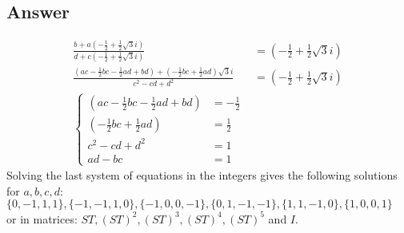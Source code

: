 \subsection*{Answer}
\noindent
\begin{align*}
    \frac{b + a (-\frac{1}{2}+\frac{1}{2}\sqrt{3}i)}{d + c (-\frac{1}{2}+\frac{1}{2}\sqrt{3}i)} &= (-\frac{1}{2}+\frac{1}{2}\sqrt{3}i) \\
    \frac{(a c - \frac{1}{2}b c - \frac{1}{2}a d + b d)+(- \frac{1}{2} bc + \frac{1}{2} ad)\sqrt{3}i}{c^2 - cd + d^2}&= (-\frac{1}{2}+\frac{1}{2}\sqrt{3}i) \\
    \left\{
    \begin{array}{ll}
        (a c - \frac{1}{2}b c - \frac{1}{2}a d + b d) &= -\frac{1}{2} \\
        (- \frac{1}{2} bc + \frac{1}{2} ad) &= \frac{1}{2}  \\
        c^2 - cd + d^2 &= 1 \\
        ad - bc &= 1
    \end{array}
    \right.
\end{align*}
Solving the last system of equations in the integers gives the following solutions for ${a,b,c,d}$: \\
$\{0,-1,1,1\},\{-1,-1,1,0\},\{-1,0,0,-1\},\{0,1,-1,-1\},\{1,1,-1,0\},\{1,0,0,1\}$ \\or in matrices:
$ST, (ST)^2, (ST)^3, (ST)^4, (ST)^5$ and $I$.